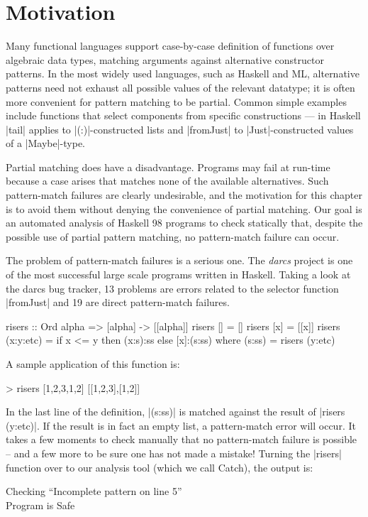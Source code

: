 \section{Motivation}
\label{secC:catch_intro}


Many functional languages support case-by-case definition of functions
over algebraic data types, matching arguments against alternative
constructor patterns.  In the most widely used languages, such as Haskell
and ML, alternative patterns need not exhaust all possible values of
the relevant datatype; it is often more convenient for pattern matching
to be partial.  Common simple examples include functions that select
components from specific constructions --- in Haskell |tail| applies
to |(:)|-constructed lists and |fromJust| to |Just|-constructed values of
a |Maybe|-type.

Partial matching does have a disadvantage.  Programs may fail at run-time
because a case arises that matches none of the available alternatives.
Such pattern-match failures are clearly undesirable, and the motivation
for this chapter is to avoid them without denying the convenience of
partial matching.  Our goal is an automated analysis of Haskell 98 programs
to check statically that, despite the possible use of partial pattern
matching, no pattern-match failure can occur.

The problem of pattern-match failures is a serious one. The \textit{darcs} project \cite{darcs} is one of the most successful large scale programs written in Haskell. Taking a look at the darcs bug tracker, 13 problems are errors related to the selector function |fromJust| and 19 are direct pattern-match failures.

\begin{example}
\label{exC:risers}
\begin{code}
risers :: Ord alpha => [alpha] -> [[alpha]]
risers [] = []
risers [x] = [[x]]
risers (x:y:etc) = if x <= y then (x:s):ss else [x]:(s:ss)
    where (s:ss) = risers (y:etc)
\end{code}

\noindent A sample application of this function is:

\ignore\begin{code}
> risers [1,2,3,1,2]
[[1,2,3],[1,2]]
\end{code}

\noindent In the last line of the definition, |(s:ss)| is matched against the result of |risers (y:etc)|. If the result is in fact an empty list, a pattern-match error will occur. It takes a few moments to check manually that no pattern-match failure is possible -- and a few more to be sure one has not made a mistake! Turning the |risers| function over to our analysis tool (which we call Catch), the output is:

\begin{console}
Checking ``Incomplete pattern on line 5'' \\
Program is Safe
\end{console}
\end{example}

